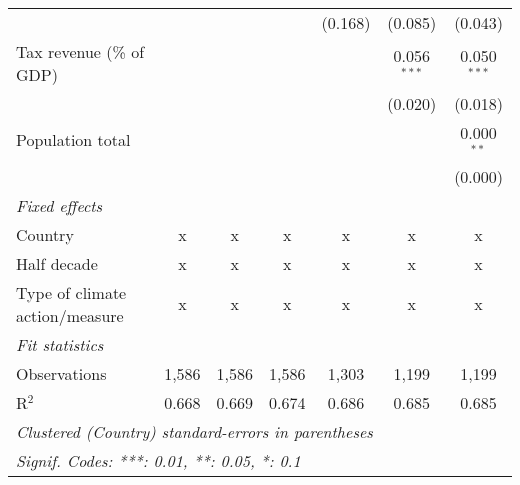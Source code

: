 \begin{tabular}{lcccccc}
                                                       &         &         &                & (0.168)        & (0.085)        & (0.043)\\   
   Tax revenue (\% of GDP)                             &         &         &                &                & 0.056$^{***}$  & 0.050$^{***}$\\   
                                                       &         &         &                &                & (0.020)        & (0.018)\\   
   Population total                                    &         &         &                &                &                & 0.000$^{**}$\\   
                                                       &         &         &                &                &                & (0.000)\\   
   \emph{Fixed effects}\\
   Country                                             & x       & x       & x              & x              & x              & x\\  
   Half decade                                         & x       & x       & x              & x              & x              & x\\  
   Type of climate action/measure                      & x       & x       & x              & x              & x              & x\\  
   \midrule \emph{Fit statistics}\\
   Observations                                        & 1,586   & 1,586   & 1,586          & 1,303          & 1,199          & 1,199\\  
   R$^2$                                               & 0.668   & 0.669   & 0.674          & 0.686          & 0.685          & 0.685\\  
   \midrule
   \multicolumn{7}{l}{\emph{Clustered (Country) standard-errors in parentheses}}\\
   \multicolumn{7}{l}{\emph{Signif. Codes: ***: 0.01, **: 0.05, *: 0.1}}\\
\end{tabular}
\par\endgroup


